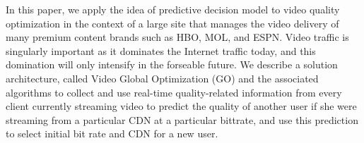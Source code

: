In this paper, we apply the idea of predictive decision model to video quality optimization in the context of a large site that manages the video delivery of many premium content brands such as HBO, MOL, and ESPN. Video traffic is singularly important as it dominates the Internet traffic today, and this domination will only intensify in the forseable future. We describe a solution architecture, called Video Global Optimization (GO) and the associated algorithms to collect and use real-time quality-related information from every client currently streaming video to predict the quality of another user if she were streaming from a particular CDN at a particular bittrate, and use this prediction to select initial bit rate and CDN for a new user.

